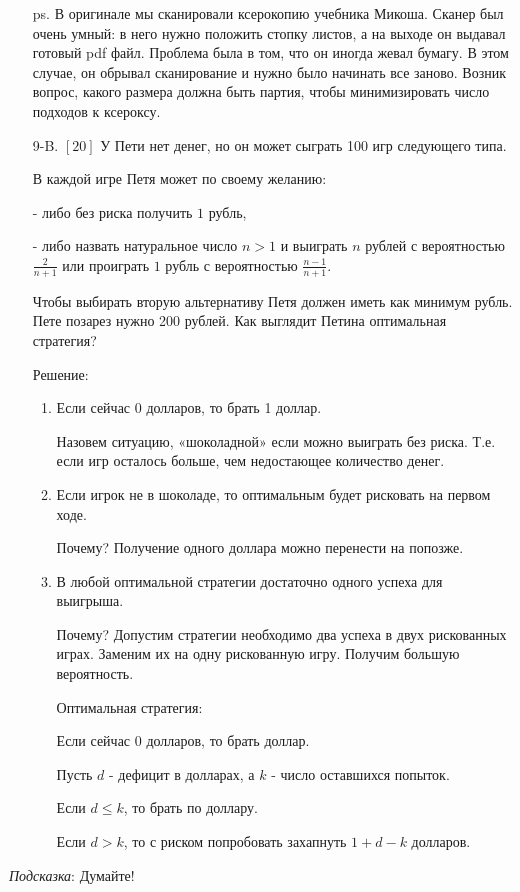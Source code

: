 \documentclass[12pt, a4paper]{article}\usepackage[]{graphicx}\usepackage[]{color}
\begin{document}
\begin{enumerate}
ps. В оригинале мы сканировали ксерокопию учебника Микоша. Сканер был очень умный: в него нужно положить стопку листов, а на выходе он выдавал готовый pdf файл. Проблема была в том, что он иногда жевал бумагу. В этом случае, он обрывал сканирование и нужно было начинать все заново. Возник вопрос, какого размера должна быть партия, чтобы минимизировать число подходов к ксероксу.

\item[9-B.] $[20]$ У Пети нет денег, но он может сыграть 100 игр следующего типа.

В каждой игре Петя может по своему желанию:

- либо без риска получить $1$ рубль,

- либо назвать натуральное число $n>1$ и выиграть $n$ рублей с вероятностью $\frac{2}{n+1}$ или проиграть $1$ рубль с вероятностью $\frac{n-1}{n+1}$.

Чтобы выбирать вторую альтернативу Петя должен иметь как минимум рубль. Пете позарез нужно 200 рублей. Как выглядит Петина оптимальная стратегия?

Решение:
\begin{enumerate}
\item Если сейчас 0 долларов, то брать 1 доллар.

Назовем ситуацию, «шоколадной» если можно выиграть без риска. Т.е. если игр осталось больше, чем недостающее количество денег.
\item Если игрок не в шоколаде, то оптимальным будет рисковать на первом ходе.

Почему? Получение одного доллара можно перенести на попозже.
\item В любой оптимальной стратегии достаточно одного успеха для выигрыша.

Почему? Допустим стратегии необходимо два успеха в двух рискованных играх. Заменим их  на одну рискованную игру. Получим большую вероятность.

Оптимальная стратегия:

Если сейчас 0 долларов, то брать доллар.

Пусть $d$ - дефицит в долларах, а $k$ - число оставшихся попыток.

Если $d\le k$, то брать по доллару.

Если $d>k$, то с риском попробовать захапнуть $1+d-k$ долларов.
\end{enumerate}
\end{enumerate}
\emph{Подсказка}: Думайте!
\end{document}
